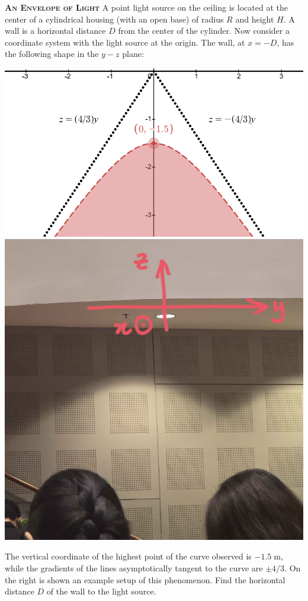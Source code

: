 \begin{problem}
{\textbf{\textsc{An Envelope of Light}}} 
A point light source on the ceiling is located at the center of a cylindrical housing (with an open base) of radius $R$ and height $H$. A wall is a horizontal distance $D$ from the center of the cylinder. Now consider a coordinate system with the light source at the origin. The wall, at $x=-D$, has the following shape in the $y-z$ plane:

\begin{center}
    \includegraphics[height=0.3\textwidth]{problems/figures/lightConeGraph.png}
    \hspace{2em}
    \includegraphics[height=0.3\textwidth]{problems/figures/lightConeHyperbola.png}
\end{center}

The vertical coordinate of the highest point of the curve observed is $-1.5\;\mathrm{m}$, while the gradients of the lines asymptotically tangent to the curve are $\pm 4/3$. On the right is shown an example setup of this phenomenon. Find the horizontal distance $D$ of the wall to the light source.
\end{problem}